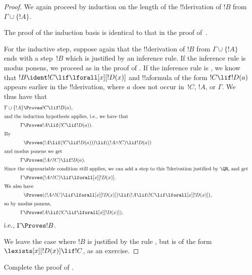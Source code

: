 \begin{proof}
We again proceed by induction on the length
of the !!{derivation} of $!B$ from $\Gamma \cup \{!A\}$.

The proof of the induction basis is identical to that in the proof
of~.

For the inductive step, suppose again that the !!{derivation} of $!B$
from $\Gamma \cup \{!A\}$ ends with a step~$!B$ which is justified by
an inference rule. If the inference rule is modus ponens, we proceed
as in the proof of . If the inference
rule is \QR, we know that $!B \ident !C \lif \lforall[x][!D(x)]$ and
!!a{formula} of the form $!C \lif !D(a)$ appears earlier in the
!!{derivation}, where $a$ does not occur in~$!C$, $!A$, or $\Gamma$. We
thus have that
\begin{align*}
  \Gamma \cup \{!A\} & \Proves !C \lif !D(a),\\
  \intertext{and the induction hypothesis applies, i.e., we have that}
    \Gamma & \Proves !A \lif (!C \lif !D(a)).\\
  \intertext{By}
  & \Proves (!A \lif (!C \lif !D(a))) \lif ((!A \land !C) \lif !D(a))\\
  \intertext{and modus ponens we get}
  \Gamma & \Proves (!A \land !C) \lif !D(a).\\
  \intertext{Since the eigenvariable condition still applies, we can add a step to this !!{derivation} justified by \QR, and get}
    \Gamma & \Proves (!A \land !C) \lif \lforall[x][!D(x)].\\
    \intertext{We also have}
    & \Proves ((!A \land !C) \lif \lforall[x][!D(x)]) \lif (!A \lif (!C \lif \lforall[x][!D(x)]),\\
    \intertext{so by modus ponens,}
    \Gamma & \Proves !A \lif (!C \lif \lforall[x][!D(x)]),
\end{align*}
i.e., $\Gamma \Proves !B$.

We leave the case where $!B$ is justified by the rule \QR, but is of
the form $\lexists[x][!D(x)] \lif !C$, as an exercise.
\end{proof}

\begin{prob}
  Complete the proof of .
\end{prob}








